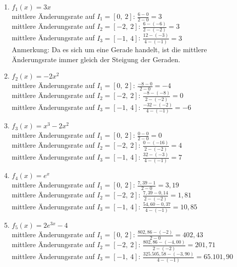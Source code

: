 \begin{Answer}[ref=aenderungsrateA2]
	\begin{enumerate}[label=\alph*)]
		\item \(f_1(x)=3x\)\\
		mittlere Änderungsrate auf \(I_1=[0,\ 2]\): \(\frac{6-0}{2-0}=3\)\\
		mittlere Änderungsrate auf \(I_2=[-2,\ 2]\): \(\frac{6-(-6)}{2-(-2)}=3\)\\
		mittlere Änderungsrate auf \(I_3=[-1,\ 4]\): \(\frac{12-(-3)}{4-(-1)}=3\)\\
		Anmerkung: Da es sich um eine Gerade handelt, ist die mittlere Änderungsrate immer gleich der Steigung der Geraden.
		\item \(f_2(x)=-2x^2\)\\
		mittlere Änderungsrate auf \(I_1=[0,\ 2]\): \(\frac{-8-0}{2-0}=-4\)\\
		mittlere Änderungsrate auf \(I_2=[-2,\ 2]\): \(\frac{-8-(-8)}{2-(-2)}=0\)\\
		mittlere Änderungsrate auf \(I_3=[-1,\ 4]\): \(\frac{-32-(-2)}{4-(-1)}=-6\)\\
		\item \(f_3(x)=x^3-2x^2\)\\
		mittlere Änderungsrate auf \(I_1=[0,\ 2]\): \(\frac{0-0}{2-0}=0\)\\
		mittlere Änderungsrate auf \(I_2=[-2,\ 2]\): \(\frac{0-(-16)}{2-(-2)}=4\)\\
		mittlere Änderungsrate auf \(I_3=[-1,\ 4]\): \(\frac{32-(-3)}{4-(-1)}=7\)\\
		\item \(f_4(x)=e^x\)\\
		mittlere Änderungsrate auf \(I_1=[0,\ 2]\): \(\frac{7,39-1}{2-0}=3,19\)\\
		mittlere Änderungsrate auf \(I_2=[-2,\ 2]\): \(\frac{7,39-0,14}{2-(-2)}=1,81\)\\
		mittlere Änderungsrate auf \(I_3=[-1,\ 4]\): \(\frac{54,60-0,37}{4-(-1)}=10,85\)\\
		\item \(f_5(x)=2e^{3x}-4\)\\
		mittlere Änderungsrate auf \(I_1=[0,\ 2]\): \(\frac{802,86-(-2)}{2-0}=402,43\)\\
		mittlere Änderungsrate auf \(I_2=[-2,\ 2]\): \(\frac{802,86-(-4,00)}{2-(-2)}=201,71\)\\
		mittlere Änderungsrate auf \(I_3=[-1,\ 4]\): \(\frac{325.505,58-(-3,90)}{4-(-1)}=65.101,90\)\\

\end{enumerate}
\end{Answer}

